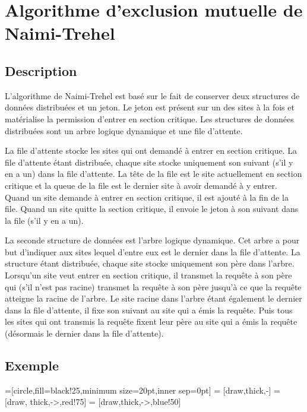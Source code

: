 
\chapter{Algorithme d'exclusion mutuelle de Naimi-Trehel}\label{naimi-trehel}


\section{Description}
L'algorithme de Naimi-Trehel \cite{naimi1996} est basé sur le fait de conserver deux structures de données distribuées et un jeton. Le jeton est présent sur un des sites à la fois et matérialise la permission d'entrer en section critique. Les structures de données distribuées sont un arbre logique dynamique et une file d'attente.

La file d'attente stocke les sites qui ont demandé à entrer en section critique. La file d'attente étant distribuée, chaque site stocke uniquement son suivant (s'il y en a un) dans la file d'attente. La tête de la file est le site actuellement en section critique et la queue de la file est le dernier site à avoir demandé à y entrer. Quand un site demande à entrer en section critique, il est ajouté à la fin de la file. Quand un site quitte la section critique, il envoie le jeton à son suivant dans la file (s'il y en a un).

La seconde structure de données est l'arbre logique dynamique. Cet arbre a pour but d'indiquer aux sites lequel d'entre eux est le dernier dans la file d'attente. La structure étant distribuée, chaque site stocke uniquement son père dans l'arbre. Lorsqu'un site veut entrer en section critique, il transmet la requête à son père qui (s'il n'est pas racine) transmet la requête à son père jusqu'à ce que la requête atteigne la racine de l'arbre. Le site racine dans l'arbre étant également le dernier dans la file d'attente, il fixe son suivant au site qui a émis la requête. Puis tous les sites qui ont transmis la requête fixent leur père au site qui a émis la requête (désormais le dernier dans la file d'attente).


\section{Exemple}

=[circle,fill=black!25,minimum size=20pt,inner sep=0pt]
 = [draw,thick,-]
 = [draw, thick,->,red!75]
 = [draw,thick,->,blue!50]

